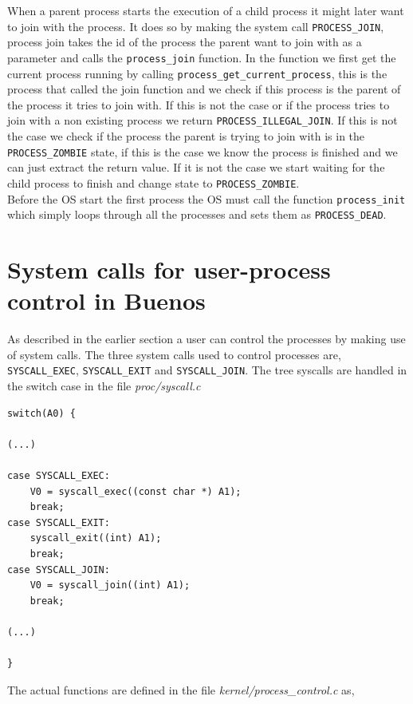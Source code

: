 \documentclass[11pt]{article}
\begin{document}
    When a parent process starts the execution of a child process it might later
    want to join with the process.  It does so by making the system call
    \texttt{PROCESS\_JOIN}, process join takes the id of the process the parent
    want to join with as a parameter and calls the \texttt{process\_join}
    function.  In the function we first get the current process running by
    calling \texttt{process\_get\_current\_process}, this is the process that
    called the join function and we check if this process is the parent of the
    process it tries to join with.  If this is not the case or if the process
    tries to join with a non existing process we return
    \texttt{PROCESS\_ILLEGAL\_JOIN}.  If this is not the case we check if the
    process the parent is trying to join with is in the \texttt{PROCESS\_ZOMBIE}
    state, if this is the case we know the process is finished and we can just
    extract the return value.  If it is not the case we start waiting for the
    child process to finish and change state to \texttt{PROCESS\_ZOMBIE}. \\

    Before the OS start the first process the OS must call the function
    \texttt{process\_init} which simply loops through all the processes and sets
    them as \texttt{PROCESS\_DEAD}.

    \section{System calls for user-process control in Buenos}
    As described in the earlier section a user can control the processes by
    making use of system calls.  The three system calls used to control
    processes are, \texttt{SYSCALL\_EXEC}, \texttt{SYSCALL\_EXIT} and
    \texttt{SYSCALL\_JOIN}.  The tree syscalls are handled in the switch case in
    the file \textit{proc/syscall.c}

    \begin{lstlisting}[style=customc]
switch(A0) {

(...)

case SYSCALL_EXEC:
    V0 = syscall_exec((const char *) A1);
    break;
case SYSCALL_EXIT:
    syscall_exit((int) A1);
    break;
case SYSCALL_JOIN:
    V0 = syscall_join((int) A1);
    break;

(...)

}
    \end{lstlisting}

    The actual functions are defined in the file
    \textit{kernel/process\_control.c} as,
\end{document}
